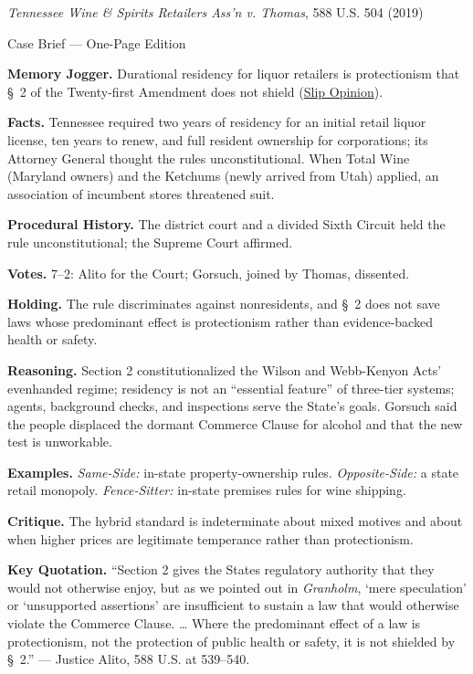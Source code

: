 \documentclass[12pt]{article}
\begin{document}
\begin{center}
{\Large \textit{Tennessee Wine \& Spirits Retailers Ass'n v. Thomas}, 588 U.S. 504 (2019)\par}
\vspace{0.3em}
{\normalsize Case Brief --- One-Page Edition\par}
\end{center}

\textbf{Memory Jogger.} Durational residency for liquor retailers is protectionism that \S~2 of the Twenty-first Amendment does not shield (\href{https://www.supremecourt.gov/opinions/18pdf/18-96_5i36.pdf}{Slip Opinion}).

\textbf{Facts.} Tennessee required two years of residency for an initial retail liquor license, ten years to renew, and full resident ownership for corporations; its Attorney General thought the rules unconstitutional. When Total Wine (Maryland owners) and the Ketchums (newly arrived from Utah) applied, an association of incumbent stores threatened suit.

\textbf{Procedural History.} The district court and a divided Sixth Circuit held the rule unconstitutional; the Supreme Court affirmed.

\textbf{Votes.} 7--2: Alito for the Court; Gorsuch, joined by Thomas, dissented.

\textbf{Holding.} The rule discriminates against nonresidents, and \S~2 does not save laws whose predominant effect is protectionism rather than evidence-backed health or safety.

\textbf{Reasoning.} Section 2 constitutionalized the Wilson and Webb-Kenyon Acts' evenhanded regime; residency is not an ``essential feature'' of three-tier systems; agents, background checks, and inspections serve the State's goals. Gorsuch said the people displaced the dormant Commerce Clause for alcohol and that the new test is unworkable.

\textbf{Examples.} \emph{Same-Side:} in-state property-ownership rules. \emph{Opposite-Side:} a state retail monopoly. \emph{Fence-Sitter:} in-state premises rules for wine shipping.

\textbf{Critique.} The hybrid standard is indeterminate about mixed motives and about when higher prices are legitimate temperance rather than protectionism.

\textbf{Key Quotation.} ``Section 2 gives the States regulatory authority that they would not otherwise enjoy, but as we pointed out in \textit{Granholm}, `mere speculation' or `unsupported assertions' are insufficient to sustain a law that would otherwise violate the Commerce Clause. \ldots{} Where the predominant effect of a law is protectionism, not the protection of public health or safety, it is not shielded by \S~2.'' --- Justice Alito, 588 U.S. at 539--540.
\end{document}
